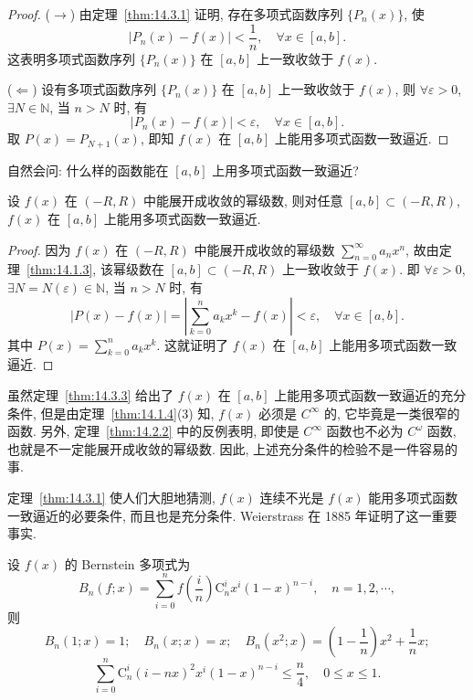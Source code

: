 \begin{proof}
($\rightarrow$) 由定理~\ref{thm:14.3.1} 证明, 存在多项式函数序列 $\{P_{n}(x)\}$, 使
\[
  |P_{n}(x)-f(x)|<\frac{1}{n},\quad\forall x\in[a,b].
\]
这表明多项式函数序列 $\{P_{n}(x)\}$ 在 $[a,b]$ 上一致收敛于 $f(x)$.

($\Leftarrow$) 设有多项式函数序列 $\{P_{n}(x)\}$ 在 $[a,b]$ 上一致收敛于 $f(x)$, 则 $\forall\varepsilon>0$, $\exists N\in\mathbb{N}$, 当 $n>N$ 时, 有
\[
  |P_{n}(x)-f(x)|<\varepsilon,\quad\forall x\in[a,b].
\]
取 $P(x)=P_{N+1}(x)$, 即知 $f(x)$ 在 $[a,b]$ 上能用多项式函数一致逼近.
\end{proof}

自然会问: 什么样的函数能在 $[a,b]$ 上用多项式函数一致逼近?

\begin{theorem}[用多项式函数一致逼近的充分条件]\label{thm:14.3.3}
设 $f(x)$ 在 $(-R,R)$ 中能展开成收敛的幂级数, 则对任意 $[a,b]\subset(-R,R)$, $f(x)$ 在 $[a,b]$ 上能用多项式函数一致逼近.
\end{theorem}

\begin{proof}
因为 $f(x)$ 在 $(-R,R)$ 中能展开成收敛的幂级数 $\sum_{n=0}^{\infty}a_{n}x^{n}$, 故由定理~\ref{thm:14.1.3}, 该幂级数在 $[a,b]\subset(-R,R)$ 上一致收敛于 $f(x)$. 即 $\forall\varepsilon>0$, $\exists N=N(\varepsilon)\in\mathbb{N}$, 当 $n>N$ 时, 有
\[
  |P(x)-f(x)|=\left|\sum_{k=0}^{n}a_{k}x^{k}-f(x)\right|<\varepsilon,\quad\forall x\in[a,b].
\]
其中 $P(x)=\sum_{k=0}^{n}a_{k}x^{k}$. 这就证明了 $f(x)$ 在 $[a,b]$ 上能用多项式函数一致逼近.
\end{proof}

虽然定理~\ref{thm:14.3.3} 给出了 $f(x)$ 在 $[a,b]$ 上能用多项式函数一致逼近的充分条件, 但是由定理~\ref{thm:14.1.4}(3) 知, $f(x)$ 必须是 $C^{\infty}$ 的, 它毕竟是一类很窄的函数. 另外, 定理~\ref{thm:14.2.2} 中的反例表明, 即使是 $C^{\infty}$ 函数也不必为 $C^{\omega}$ 函数, 也就是不一定能展开成收敛的幂级数. 因此, 上述充分条件的检验不是一件容易的事.

定理~\ref{thm:14.3.1} 使人们大胆地猜测, $f(x)$ 连续不光是 $f(x)$ 能用多项式函数一致逼近的必要条件, 而且也是充分条件. Weierstrass 在 1885 年证明了这一重要事实.

\begin{lemma}\label{lem:14.3.1}
设 $f(x)$ 的 Bernstein 多项式为
\[
  B_{n}(f;x)=\sum_{i=0}^{n}f\left(\frac{i}{n}\right)\mathrm{C}_{n}^{i}x^{i}(1-x)^{n-i},\quad n=1,2,\cdots,
\]
则
\[
  B_{n}(1;x)=1;\quad B_{n}(x;x)=x;\quad B_{n}(x^{2};x)=\left(1-\frac{1}{n}\right)x^{2}+\frac{1}{n}x;
\]
\[
  \sum_{i=0}^{n}\mathrm{C}_{n}^{i}(i-nx)^{2}x^{i}(1-x)^{n-i}\leqslant\frac{n}{4},\quad0\leqslant x\leqslant1.
\]
\end{lemma}

